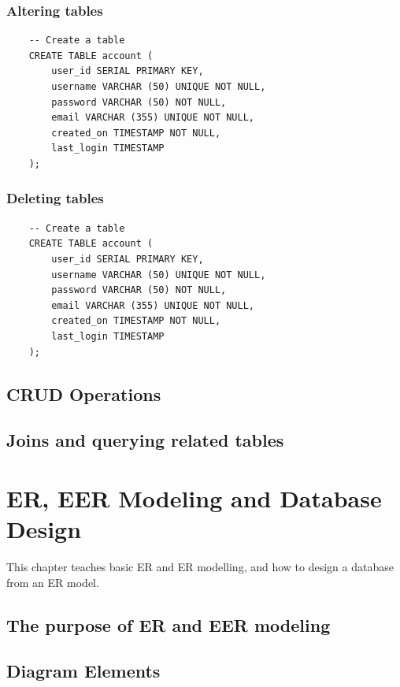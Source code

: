 \subsection{Altering tables}
\begin{verbatim}
    -- Create a table
    CREATE TABLE account (
        user_id SERIAL PRIMARY KEY,
        username VARCHAR (50) UNIQUE NOT NULL,
        password VARCHAR (50) NOT NULL,
        email VARCHAR (355) UNIQUE NOT NULL,
        created_on TIMESTAMP NOT NULL,
        last_login TIMESTAMP
    );
\end{verbatim}

\subsection{Deleting tables}
\begin{verbatim}
    -- Create a table
    CREATE TABLE account (
        user_id SERIAL PRIMARY KEY,
        username VARCHAR (50) UNIQUE NOT NULL,
        password VARCHAR (50) NOT NULL,
        email VARCHAR (355) UNIQUE NOT NULL,
        created_on TIMESTAMP NOT NULL,
        last_login TIMESTAMP
    );
\end{verbatim}

\section{CRUD Operations}

\section{Joins and querying related tables}

\chapter{ER, EER Modeling and Database Design}
\label{chap:relational:eer-modeling-and-database-design}
This chapter teaches basic ER and ER modelling, and how to design a database from an ER model.

\section{The purpose of ER and EER modeling}
\section{Diagram Elements}
